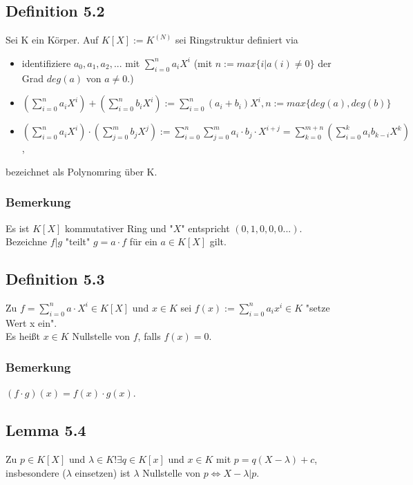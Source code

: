 \documentclass[a4paper, 12pt]{extarticle}
\begin{document}
\subsection*{Definition 5.2}
Sei K ein Körper. Auf $K[X] := K^{(N)}$ sei Ringstruktur definiert via
\begin{itemize}
	\item identifiziere $a_0, a_1, a_2, ...$ mit $\sum_{i=0}^{n}a_i X^i$ (mit $n:= max\{  i | a(i) \neq 0\}$ der Grad $deg(a)$ von $a \neq 0$.)
	\item $(\sum_{i=0}^{n} a_i X^i) + (\sum_{i=0}^{n} b_i X^i) := \sum_{i=0}^{n} (a_i + b_i)X^i , n := max\{deg(a), deg(b)\}$
	\item $(\sum_{i=0}^{n}a_i X^i) \cdot  (\sum_{j=0}^{m} b_j X^j) := \sum_{i=0}^{n} \sum_{j=0}^{m} a_i \cdot b_j \cdot X^{i + j} = \sum_{k = 0}^{m + n}(\sum_{i= 0}^{k} a_i b_{k-i} X^k)$,
\end{itemize}
bezeichnet als Polynomring über K.
\subsubsection*{Bemerkung}
Es ist $K[X]$ kommutativer Ring und "$X$" entspricht $(0,1,0,0,0...)$.\\
Bezeichne $f|g$ "teilt" $g = a\cdot f$ für ein $a \in K[X]$ gilt.

\subsection*{Definition 5.3}
Zu $f = \sum_{i=0}^{n} a\cdot X^i \in K[X]$ und $x \in K$ sei $f(x) := \sum_{i=0}^{n} a_i x^i \in K$ "setze Wert x ein".\\
Es heißt $x \in K$ Nullstelle von $f$, falls $f(x)=0$.\\
\subsubsection*{Bemerkung}
$(f \cdot g)(x) = f(x) \cdot g(x)$.\\

\subsection*{Lemma 5.4}
Zu $p \in K[X]$ und $\lambda \in  K !\exists q\in K[x]$ und $x \in K$ mit $p = q(X-\lambda ) + c$, insbesondere ($\lambda$ einsetzen) ist $\lambda$ Nullstelle von $p \Leftrightarrow X - \lambda | p$.
\end{document}
